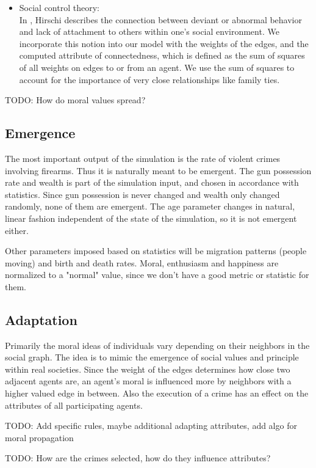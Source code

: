 \documentclass{article}
\begin{document}
\begin{itemize}
				\item Social control theory:\\
					In \cite{socialcontrol}, Hirschi describes the connection between deviant
					or abnormal behavior and lack of attachment to others within one's social
					environment. We incorporate this notion into our model with the weights of
					the edges, and the computed attribute of connectedness, which is defined
					as the sum of squares of all weights on edges to or from an agent. We use
					the sum of squares to account for the importance of very close relationships
					like family ties.
			\end{itemize}
			\par
			TODO: How do moral values spread?

		\subsection{Emergence}
			The most important output of the simulation is the rate of violent crimes involving
			firearms. Thus it is naturally meant to be emergent. The gun possession rate and
			wealth is part
			of the simulation input, and chosen in accordance with statistics. Since gun
			possession is never changed and wealth only changed randomly, none of them are
			emergent.
			The age parameter changes in natural, linear fashion independent of the state of the
			simulation, so it is not emergent either.
			\par
			Other parameters imposed based on statistics will be migration patterns (people
			moving) and birth and death
			rates. Moral, enthusiasm and happiness are normalized to a "normal" value, since
			we don't have a good metric or statistic for them.

		\subsection{Adaptation}
			Primarily the moral ideas of individuals vary depending on their neighbors in the
			social graph. The idea is to mimic the emergence of social values and principle
			within real societies. Since the weight of the edges determines how close two adjacent
			agents are, an agent's moral is influenced more by neighbors with a higher valued
			edge in between.
			Also the execution of a crime has an effect on the attributes
			of all participating agents.
			\\\par
			TODO: Add specific rules, maybe additional adapting attributes, add algo for
				moral propagation
			\par
			TODO: How are the crimes selected, how do they influence attributes?
\end{document}
